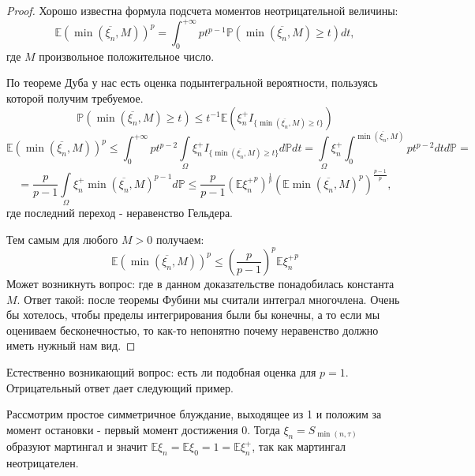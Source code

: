 \documentclass[12pt,a4paper]{article} %
\newcommand{\E}{\mathbb{E}}
\newcommand{\PR}{\mathbb{P}}
\begin{document}
	\begin{proof}
		Хорошо известна формула подсчета моментов неотрицательной величины:
		$$\E(\min(\overline{\xi_n},M))^p=\int_0^{+\infty}pt^{p-1}\PR(\min(\overline{\xi_n},M)\geq t)dt,$$
		где $M$ произвольное положительное число.
		
		По теореме Дуба у нас есть оценка подынтегральной вероятности, пользуясь которой получим требуемое.
		$$\PR(\min(\overline{\xi_n},M)\geq t)\leq t^{-1}\E(\xi_n^{+}I_{\{\min(\overline{\xi_n},M)\geq t\}})$$
		$$\E(\min(\overline{\xi_n},M))^p\leq\int_0^{+\infty}pt^{p-2}\int\limits_{\Omega}\xi_n^{+}I_{\{\min(\overline{\xi_n},M)\geq t\}}d\PR dt=\int\limits_{\Omega}\xi_n^{+}\int_0^{\min(\overline{\xi_n},M)}pt^{p-2}dtd\PR=$$
		$$=\frac{p}{p-1}\int\limits_{\Omega}\xi_n^{+}\min(\overline{\xi_n},M)^{p-1}d\PR\leq\frac{p}{p-1}(\E{\xi_n^{+}}^p)^\frac{1}{p}(\E\min(\overline{\xi_n},M)^p)^{\frac{p-1}{p}},$$
		где последний переход - неравенство Гельдера.
		
		Тем самым для любого $M>0$ получаем:
		$$\E(\min(\overline{\xi_n},M))^p\leq\left(\frac{p}{p-1}\right)^p\E{\xi_n^{+}}^p$$
		Может возникнуть вопрос: где в данном доказательстве понадобилась константа $M$. Ответ такой: после теоремы Фубини мы считали интеграл многочлена. Очень бы хотелось, чтобы пределы интегрирования были бы конечны, а то если мы оцениваем бесконечностью, то как-то непонятно почему неравенство должно иметь нужный нам вид.
	\end{proof}
	Естественно возникающий вопрос: есть ли подобная оценка для $p=1$. Отрицательный ответ дает следующий пример.
	
	Рассмотрим простое симметричное блуждание, выходящее из 1 и положим за момент остановки - первый момент достижения 0. Тогда $\xi_n=S_{\min(n,\tau)}$ образуют мартингал и значит $\E\xi_n=\E\xi_0=1=\E\xi_n^{+}$, так как мартингал неотрицателен.
	
\end{document}
